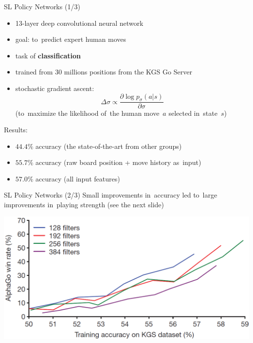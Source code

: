 \documentclass{beamer}
\begin{document}
{    \begin{frame}{SL Policy Networks (1/3)}
      \begin{itemize}[<+- | alert@+>]
        \item 13-layer deep convolutional neural network
        \item goal: to~predict expert human moves
        \item task of \textbf{classification}
        \item trained from 30 millions positions from the KGS Go Server
        \item stochastic gradient ascent:
          \[
            \Delta \sigma \propto \frac{\partial \log p_\sigma (a|s)}{\partial \sigma}
          \]
          {\tiny (to~maximize the likelihood of~the human move~$a$ selected in~state~$s$)}
      \end{itemize}
      \pause

      Results:
      \pause
      \begin{itemize}[<+- | alert@+>]
        \item $44.4\%$ accuracy (the state-of-the-art from other groups)
        \item $55.7\%$ accuracy (raw board position + move history as~input)
        \item $57.0\%$ accuracy (all input features)
      \end{itemize}
    \end{frame}

    \begin{frame}{SL Policy Networks (2/3)}
      Small improvements in~accuracy led to~large improvements in~playing strength (see the next slide)
      \begin{center}
        \includegraphics[width=\textwidth]{../img/SL_policy_accuracy_vs_win_rate.png}
      \end{center}
    \end{frame}

}
\end{document}
